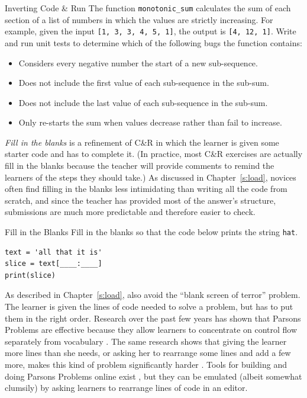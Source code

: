 \begin{aside}{Inverting Code \& Run}
  The function \texttt{monotonic\_sum} calculates the sum of each section of a
  list of numbers in which the values are strictly increasing. For
  example, given the input \texttt{{[}1,\ 3,\ 3,\ 4,\ 5,\ 1{]}}, the output is
  \texttt{{[}4,\ 12,\ 1{]}}. Write and run unit tests to determine which of the
  following bugs the function contains:

  \begin{itemize}
  \item
    Considers every negative number the start of a new sub-sequence.
  \item
    Does not include the first value of each sub-sequence in the
    sub-sum.
  \item
    Does not include the last value of each sub-sequence in the
    sub-sum.
  \item
    Only re-starts the sum when values decrease rather than fail to
    increase.
  \end{itemize}
\end{aside}

\emph{Fill in the blanks} is a refinement of C\&R in which the learner is
given some starter code and has to complete it. (In practice, most C\&R
exercises are actually fill in the blanks because the teacher will
provide comments to remind the learners of the steps they should take.)
As discussed in Chapter~\ref{s:load}, novices often find filling in the
blanks less intimidating than writing all the code from scratch, and
since the teacher has provided most of the answer's structure,
submissions are much more predictable and therefore easier to check.

\begin{aside}{Fill in the Blanks}
  Fill in the blanks so that the code below prints the string \texttt{\textquotesingle{}hat\textquotesingle{}}.

\begin{verbatim}
text = 'all that it is'
slice = text[____:____]
print(slice)
\end{verbatim}
\end{aside}

As described in Chapter~\ref{s:load},  also avoid the ``blank screen of terror''
problem. The learner is given the lines of code needed to solve a
problem, but has to put them in the right order. Research over the
past few years has shown that Parsons Problems are effective because
they allow learners to concentrate on control flow separately from
vocabulary
\cite{Pars2006,Eric2015,Morr2016,Eric2017}. The
same research shows that giving the learner more lines than she needs,
or asking her to rearrange some lines and add a few more, makes this
kind of problem significantly harder \cite{Harm2016}. Tools for
building and doing Parsons Problems online exist \cite{Ihan2011},
but they can be emulated (albeit somewhat clumsily) by asking learners
to rearrange lines of code in an editor.

